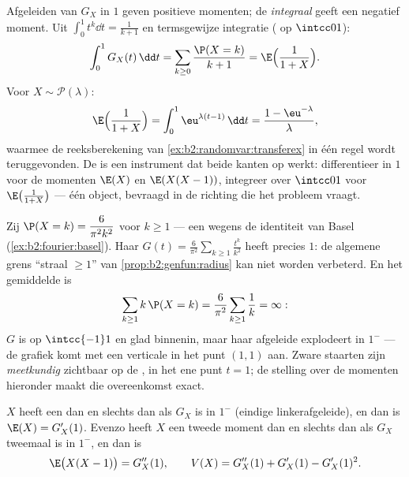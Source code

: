 \begin{example}\label{ex:b2:genfun:integraltrick}
Afgeleiden van $G_X$ in $1$ geven positieve momenten; de
\emph{integraal} geeft een negatief moment. Uit $\int_0^1t^k\dd t =
\frac1{k+1}$ en termsgewijze integratie ( op
$\intcc01$):
\[
\int_0^1G_X(t)\,\dd t = \sum_{k\geq0}\frac{\P(X =
k)}{k+1} = \E\Bigl(\frac1{1+X}\Bigr).
\]
Voor $X \sim \mathcal P(\lambda)$:
\[
\E\Bigl(\frac1{1+X}\Bigr) =
\int_0^1\eu^{\lambda(t-1)}\,\dd t = \frac{1 -
\eu^{-\lambda}}{\lambda},
\]
waarmee de reeksberekening van
\cref{ex:b2:randomvar:transferex} in één regel wordt
teruggevonden. De  is een instrument dat beide
kanten op werkt: differentieer in $1$ voor de momenten $\E(X)$ en
$\E(X(X-1))$, integreer over $\intcc01$ voor
$\E\bigl(\frac1{1+X}\bigr)$ --- één  object, bevraagd in
de richting die het probleem vraagt.
\end{example}

\begin{example}\label{ex:b2:genfun:heavytail}
Zij $\P(X = k) = \dfrac{6}{\pi^2k^2}$ voor $k \geq 1$ --- een
 wegens de identiteit van Basel
(\cref{ex:b2:fourier:basel}). Haar  $G(t) =
\frac6{\pi^2}\sum_{k\geq1}\frac{t^k}{k^2}$ heeft
 precies $1$: de algemene grens ``straal $\geq
1$'' van \cref{prop:b2:genfun:radius} kan niet worden verbeterd. En
het gemiddelde is
\[
\sum_{k\geq1}k\,\P(X = k) =
\frac6{\pi^2}\sum_{k\geq1}\frac1k = \infty :
\]
$G$ is  op $\intcc{-1}1$ en glad binnenin, maar haar
afgeleide explodeert in $1^-$ --- de grafiek komt met een verticale
 in het punt $(1, 1)$ aan. Zware staarten zijn
\emph{meetkundig} zichtbaar op de , in het ene
punt $t = 1$; de stelling over de momenten hieronder maakt die
overeenkomst exact.
\end{example}

\begin{theorem}\label{thm:b2:genfun:moments}
$X$ heeft een  dan en slechts dan als $G_X$
 is in $1^-$ (eindige linkerafgeleide), en dan is
$\E(X) = G_X'(1)$. Evenzo heeft $X$ een tweede moment dan en
slechts dan als $G_X$ tweemaal  is in $1^-$, en
dan is
\[
\E\bigl(X(X - 1)\bigr) = G_X''(1),
\qquad
V(X) = G_X''(1) + G_X'(1) - G_X'(1)^2 .
\]
\end{theorem}

